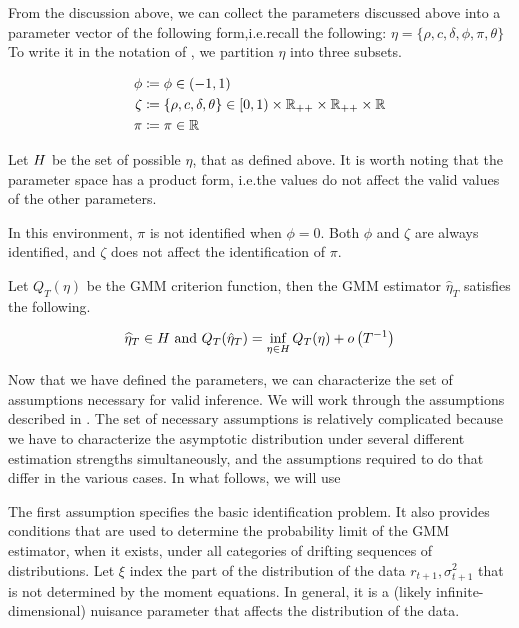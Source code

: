 \documentclass[11pt, letterpaper, twoside, final]{article}
\begin{document}
From the discussion above, we can collect the parameters discussed above into a parameter vector of the following
form,i.e.\@ recall the following: $\eta = \lbrace \rho, c, \delta, \phi, \pi, \theta \rbrace$
To write it in the notation of \textcite{andrews2014Gmm}, we partition $\eta$ into three subsets.

\begin{align}
    \phi &\coloneqq \phi  \in (-1, 1) \\ 
    \zeta &\coloneqq \lbrace \rho, c, \delta, \theta \rbrace \in [0,1) \times \mathbb{R}_{++} \times \mathbb{R}_{++} \times
    \mathbb{R}  \\
    \pi &\coloneqq \pi \in \mathbb{R} 
\end{align}

Let $H$ be the set of possible $\eta$, that as defined above.
It is worth noting that the parameter space has a product form, i.e.\@ the values do not affect the valid values
of the other parameters.

In this environment, $\pi$ is not identified when $\phi = 0$.
Both $\phi$ and $\zeta$ are always identified, and $\zeta$ does not affect the identification of $\pi$.

Let $Q_T(\eta)$ be the GMM criterion function, then the GMM estimator $\hat{\eta}_T$ satisfies the following.


\begin{equation}
    \widehat{\eta}_T \in \Eta\ \text{and}\ Q_T(\hat{\eta}_T) = \inf_{\eta \in \Eta} Q_T(\eta) +
    o\left(T^{-1}\right) 
\end{equation}


Now that we have defined the parameters, we can characterize the set of assumptions necessary for valid inference.
We will work through the assumptions described in \textcite{andrews2014Gmm}.
The set of necessary assumptions is relatively complicated because we have to characterize the asymptotic
distribution under several different estimation strengths simultaneously, and the assumptions required to do that
  differ in the various cases. 
In what follows, we will use 

The first assumption specifies the basic identification
problem. It also provides conditions that are used to determine the
probability limit of the GMM estimator, when it exists, under all categories
of drifting sequences of distributions.
Let $\xi$ index the part of the distribution of the data $r_{t+1}, \sigma^2_{t+1}$ that is not determined by the
moment equations.
In general, it is a (likely infinite-dimensional) nuisance parameter that affects the distribution of the data. 
\end{document}
